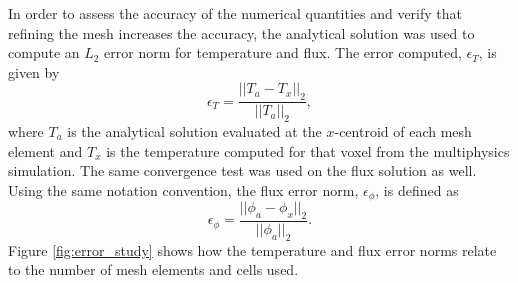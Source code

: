\documentclass[letterpaper]{mc2023}
\begin{document}
In order to assess the accuracy of the numerical quantities and verify that refining the mesh increases the accuracy, the analytical solution
was used to compute an $L_{2}$ error norm for temperature and flux. The error computed, $\epsilon_{T}$, is given by
\begin{equation}
    \epsilon_{T} = \frac{|| T_{a} - T_{x} ||_{2}}{|| T_{a} ||_{2}},
\end{equation}
where $T_{a}$ is the analytical solution evaluated at the $x$-centroid of each mesh element and $T_{x}$ is the temperature computed for that
voxel from the multiphysics simulation. The same convergence test was used on the flux solution as well. Using the same notation convention, 
the flux error norm, $\epsilon_{\phi}$, is defined as
\begin{equation}
    \epsilon_{\phi} =  \frac{|| \phi_{a} - \phi_{x} ||_{2}}{|| \phi_{a} ||_{2}}.
\end{equation}
Figure \ref{fig:error_study} shows how the temperature and flux error norms relate to the number of mesh elements and cells used.
\end{document}
